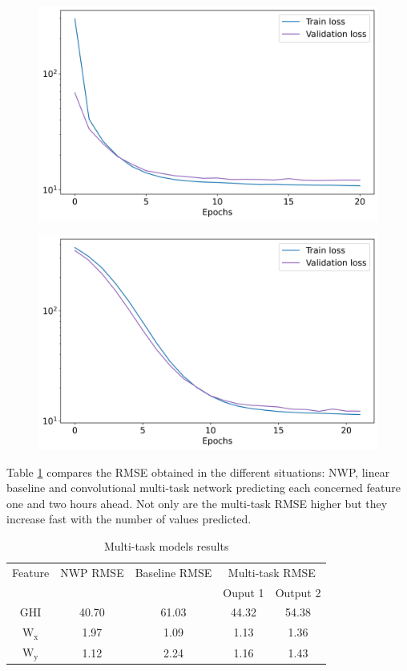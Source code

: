 \documentclass{article}
\begin{document}
\begin{figure}[H]
\centering
\begin{minipage}{.5\textwidth}
	\centering
	\includegraphics[width=.95\linewidth]{img/restrain.png}
	\label{fig:Res}
\end{minipage}%
\begin{minipage}{.5\textwidth}
	\centering
	\includegraphics[width=.95\linewidth]{img/convtrain.png}
	\label{fig:Conv}
\end{minipage}
\end{figure}

Table \ref{tab:results} compares the RMSE obtained in the different situations: NWP, linear baseline and convolutional
multi-task network predicting each concerned feature one and two hours ahead. Not only are the multi-task
RMSE higher but they increase fast with the number of values predicted.

\begin{table}[htb]\centering
\begin{tabular}{ccccc}
\toprule
      Feature&NWP RMSE&Baseline RMSE&\multicolumn{2}{c}{Multi-task RMSE}\\\cmidrule{4-5}
      &	 &	&	Ouput 1	&Output 2\\ \midrule
      GHI	&40.70&61.03&	44.32&54.38\\
      $\mathrm W_{\mathrm x}$	&1.97&1.09&1.13&1.36\\
      $\mathrm W_{\mathrm y}$	&1.12&2.24&1.16&1.43\\
      \bottomrule
\end{tabular}
\caption{Multi-task models results}
\label{tab:results}
\end{table}
\end{document}
